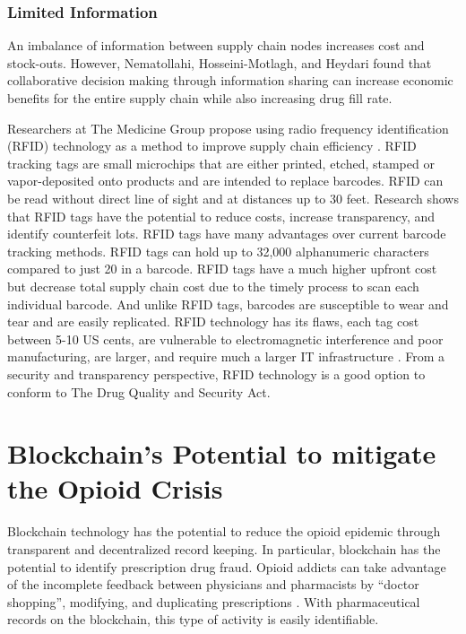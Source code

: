 \documentclass[sigconf]{acmart}
\begin{document}
\subsubsection{Limited Information} An imbalance of information between supply chain nodes increases cost and stock-outs. However, Nematollahi, Hosseini-Motlagh, and Heydari \cite{Nematollahi01} found that collaborative decision making through information sharing can increase economic benefits for the entire supply chain while also increasing drug fill rate.

Researchers at The Medicine Group propose using radio frequency identification (RFID) technology as a method to improve supply chain efficiency \cite{Taylor01}. RFID tracking tags are small microchips that are either printed, etched, stamped or vapor-deposited onto products and are intended to replace barcodes. RFID can be read without direct line of sight and at distances up to 30 feet. Research shows that RFID tags have the potential to reduce costs, increase transparency, and identify counterfeit lots. RFID tags have many advantages over current barcode tracking methods. RFID tags can hold up to 32,000 alphanumeric characters compared to just 20 in a barcode. RFID tags have a much higher upfront cost but decrease total supply chain cost due to the timely process to scan each individual barcode. And unlike RFID tags, barcodes are susceptible to wear and tear and are easily replicated. RFID technology has its flaws, each tag cost between 5-10 US cents, are vulnerable to electromagnetic interference and poor manufacturing, are larger, and require much a larger IT infrastructure \cite{Taylor01} \cite{opsis9}. From a security and transparency perspective, RFID technology is a good option to conform to The Drug Quality and Security Act.

\section{Blockchain's Potential to mitigate the Opioid Crisis}
Blockchain technology has the potential to reduce the opioid epidemic through transparent and decentralized record keeping. In particular, blockchain has the potential to identify prescription drug fraud. Opioid addicts can take advantage of the incomplete feedback between physicians and pharmacists by ``doctor shopping'', modifying, and duplicating prescriptions \cite{hitchingHealthcare}. With pharmaceutical records on the blockchain, this type of activity is easily identifiable. 
\end{document}
